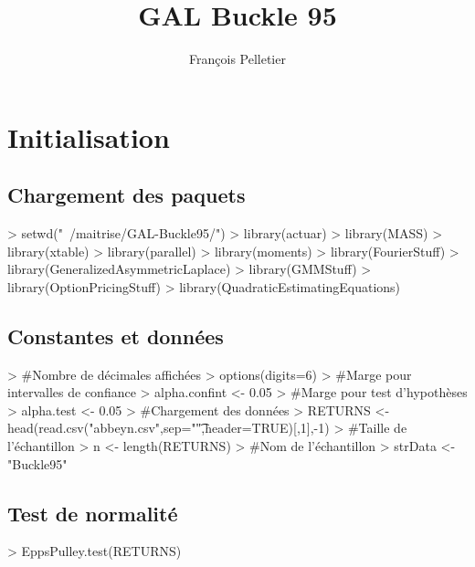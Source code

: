 \documentclass[letter]{report}
\begin{document}
\title{GAL Buckle 95}
\author{François Pelletier}
\maketitle
\tableofcontents

\chapter{Initialisation}

\section{Chargement des paquets}
\begin{Schunk}
\begin{Sinput}
> setwd("~/maitrise/GAL-Buckle95/")
> library(actuar)
> library(MASS)
> library(xtable)
> library(parallel)
> library(moments)
> library(FourierStuff)
> library(GeneralizedAsymmetricLaplace)
> library(GMMStuff)
> library(OptionPricingStuff)
> library(QuadraticEstimatingEquations)
\end{Sinput}
\end{Schunk}

\section{Constantes et données}

\begin{Schunk}
\begin{Sinput}
> #Nombre de décimales affichées
> options(digits=6)
> #Marge pour intervalles de confiance
> alpha.confint <- 0.05 
> #Marge pour test d'hypothèses
> alpha.test <- 0.05
> #Chargement des données
> RETURNS <- head(read.csv("abbeyn.csv",sep="\t",header=TRUE)[,1],-1)
> #Taille de l'échantillon
> n <- length(RETURNS)
> #Nom de l'échantillon
> strData <- "Buckle95"
\end{Sinput}
\end{Schunk}

\section{Test de normalité}

\begin{Schunk}
\begin{Sinput}
> EppsPulley.test(RETURNS)
\end{Sinput}
\end{Schunk}
\end{document}
